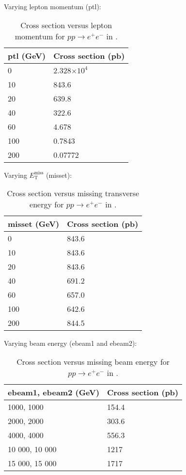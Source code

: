 Varying lepton momentum (ptl):

\begin{table}[H]
\centering
    \begin{tabular}{l|l}
    ptl (GeV) & Cross section (pb) \\ \hline
    0         & 2.328$\times10^4$            \\
    10        & 843.6              \\
    20        & 639.8              \\
    40        & 322.6              \\
    60        & 4.678              \\
    100       & 0.7843             \\
    200       & 0.07772            \\
    \end{tabular}
   \caption{Cross section versus lepton momentum for $pp \rightarrow e^+ e^-$ in \madgraph.}
\end{table}

Varying $E_{\mathrm{T}}^{\mathrm{miss}}$ (misset):

\begin{table}[H]
\centering
    \begin{tabular}{l|l}
    misset (GeV) & Cross section (pb) \\ \hline
    0            & 843.6              \\
    10           & 843.6              \\
    20           & 843.6              \\
    40           & 691.2              \\
    60           & 657.0              \\
    100          & 642.6              \\
    200          & 844.5              \\
    \end{tabular}
    \caption{Cross section versus missing transverse energy for $pp \rightarrow e^+ e^-$ in \madgraph.}
\end{table}

Varying beam energy (ebeam1 and ebeam2):

\begin{table}[H]
\centering
    \begin{tabular}{l|l}
    ebeam1, ebeam2 (GeV) & Cross section (pb) \\ \hline
    1000, 1000           & 154.4              \\
    2000, 2000           & 303.6              \\
    4000, 4000           & 556.3              \\
    10 000, 10 000       & 1217               \\
    15 000, 15 000       & 1717               \\
    \end{tabular}
    \caption{Cross section versus missing beam energy for $pp \rightarrow e^+ e^-$ in \madgraph.}
\end{table}


